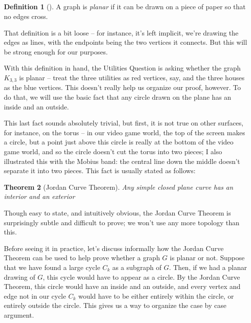 \documentclass[10pt,]{book}
\theoremstyle{plain}
\newtheorem{theorem}{Theorem}[section]
\theoremstyle{definition}
\newtheorem{definition}[theorem]{Definition}
\theoremstyle{definition}
\theoremstyle{definition}
\theoremstyle{definition}
\numberwithin{equation}{section}
\begin{document}
\subsection[{}]{}\label{subsection-27}
\begin{definition}[{}]\label{definition-20}
\hypertarget{p-277}{}%
A graph is \emph{planar} if it can be drawn on a piece of paper so that no edges cross.%
\end{definition}
\hypertarget{p-278}{}%
That definition is a bit loose -- for instance, it's left implicit, we're drawing the edges as lines, with the endpoints being the two vertices it connects.  But this will be strong enough for our purposes.%
\par
\hypertarget{p-279}{}%
With this definition in hand, the Utilities Question is asking whether the graph \(K_{3,3}\) is planar -- treat the three utilities as red vertices, say, and the three houses as the blue vertices.  This doesn't really help us organize our proof, however. To do that, we will use the basic fact that any circle drawn on the plane has an inside and an outside.%
\par
\hypertarget{p-280}{}%
This last fact sounds absolutely trivial, but first, it is not true on other surfaces, for instance, on the torus -- in our video game world, the top of the screen makes a circle, but a point just above this circle is really at the bottom of the video game world, and so the circle doesn't cut the torus into two pieces; I also illustrated this with the Mobius band: the central line down the middle doesn't separate it into two pieces.  This fact is usually stated as follows:%
\begin{theorem}[{Jordan Curve Theorem}]\label{theorem-6}
\hypertarget{p-281}{}%
Any simple closed plane curve has an interior and an exterior%
\end{theorem}
\hypertarget{p-282}{}%
Though easy to state, and intuitively obvious, the Jordan Curve Theorem is surprisingly subtle and difficult to prove; we won't use any more topology than this.%
\par
\hypertarget{p-283}{}%
Before seeing it in practice, let's discuss informally how the Jordan Curve Theorem can be used to help prove whether a graph \(G\) is planar or not.  Suppose that we have found a large cycle \(C_k\) as a subgraph of \(G\).  Then, if we had a planar drawing of \(G\), this cycle would have to appear as a circle.  By the Jordan Curve Theorem, this circle would have an inside and an outside, and every vertex and edge not in our cycle \(C_k\) would have to be either entirely within the circle, or entirely outside the circle.  This gives us a way to organize the case by case argument.%
\end{document}
